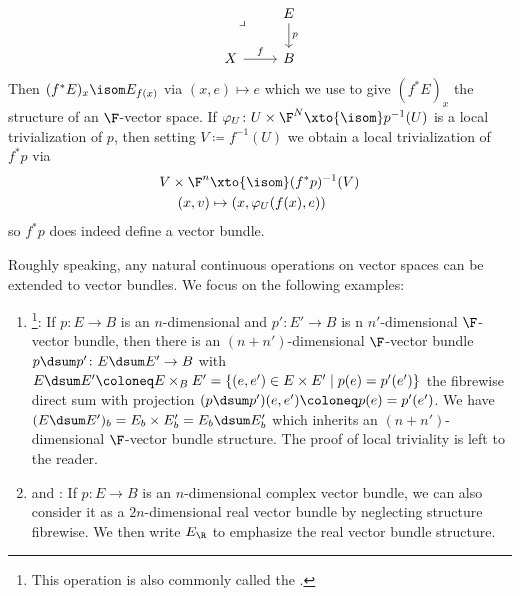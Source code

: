 \begin{definition}
\begin{enumerate}
\begin{equation*}
\begin{tikzcd}
							\ar[dr, phantom, "\lrcorner" very near start]
						& E
							\ar[d, "p"]
					\\
					X
							\ar[r, "f"]
						& B
				\end{tikzcd}
			\end{equation*}
			Then $(f^* E)_x \isom E_{f(x)}$ via $(x, e) \mapsto e$ which we use to give $(f^* E)_x$ the structure of an $\F$-vector space.
			If $\varphi_U\colon U \times \F^N \xto{\isom} p^{-1}(U)$ is a local trivialization of $p$, then setting $V \coloneq f^{-1}(U)$ we obtain a local trivialization of $f^* p$ via
			\begin{align*}
				V \times \F^n &\xto{\isom} (f^* p)^{-1}(V) \\
				(x, v) &\mapsto (x, \varphi_U(f(x), e))
			\end{align*}
			so $f^* p$ does indeed define a vector bundle.
	\end{enumerate}
	Roughly speaking, any natural continuous operations on vector spaces can be extended to vector bundles.
	We focus on the following examples:
	\begin{enumerate}[resume]
		\item {}\footnote{This operation is also commonly called the .}:
			If $p\colon E \to B$ is an $n$-dimensional and $p'\colon E' \to B$ is n $n'$-dimensional $\F$-vector bundle, then there is an $(n + n')$-dimensional $\F$-vector bundle $p \dsum p'\colon E \dsum E' \to B$ with $E \dsum E' \coloneq E \times_B E' = \{(e, e') \in E \times E' \mid p(e) = p'(e')\}$ the fibrewise direct sum with projection $(p \dsum p')(e, e') \coloneq p(e) = p'(e')$.
			We have $(E \dsum E')_b = E_b \times E'_b = E_b \dsum E'_b$ which inherits an $(n + n')$-dimensional $\F$-vector bundle structure.
			The proof of local triviality is left to the reader.
		\item {} and :
			If $p\colon E \to B$ is an $n$-dimensional complex vector bundle, we can also consider it as a $2n$-dimensional real vector bundle by neglecting structure fibrewise.
			We then write $E_{\R}$ to emphasize the real vector bundle structure.


\end{enumerate}
\end{definition}
